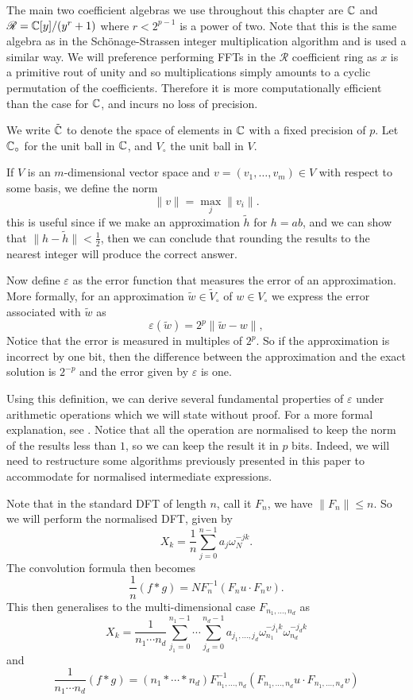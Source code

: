 The main two coefficient algebras we use throughout this chapter are ${\mathbb C}$ and $\mathscr{R} = {\mathbb C}[y]/(y^r + 1)$ where $r < 2^{p-1}$ is a power of two. Note that this is the same algebra as in the Sch\"{o}nage-Strassen integer multiplication algorithm and is used a similar way.
We will preference performing FFTs in the $\mathscr{R}$ coefficient ring as $x$ is a primitive rout of unity and so multiplications simply amounts to a cyclic permutation of the coefficients. Therefore it is more computationally efficient than the case for ${\mathbb C}$, and incurs no loss of precision.

We write $\tilde{{\mathbb C}}$ to denote the space of elements in ${\mathbb C}$ with a fixed precision of $p$. Let ${\mathbb C}_\circ$ for the unit ball in ${\mathbb C}$, and $V_\circ$ the unit ball in $V$.

If $V$ is an $m$-dimensional vector space and $v = (v_1, \ldots, v_m) \in V$ with respect to some basis, we define the norm
\[
    \|v\| = \max_j \|v_i\|.
\]
this is useful since if we make an approximation $\tilde{h}$ for $h = ab$, and we can show that $\|h - \tilde{h}\| < \frac{1}{2}$, then we can conclude that rounding the results to the nearest integer will produce the correct answer.

Now define $\varepsilon$ as the error function that measures the error of an approximation. More formally, for an approximation $\tilde{w} \in \tilde{V}_\circ$ of $w \in V_\circ$ we express the error associated with $\tilde{w}$ as
\[
    \varepsilon(\tilde{w}) = 2^p \|\tilde{w} - w\|,
\]
Notice that the error is measured in multiples of $2^p$. So if the approximation is incorrect by one bit, then the difference between the approximation and the exact solution is $2^{-p}$ and the error given by $\varepsilon$ is one.

Using this definition, we can derive several fundamental properties of $\varepsilon$ under arithmetic operations which we will state without proof. For a more formal explanation, see \cite{nlogn}. Notice that all the operation are normalised to keep the norm of the results less than $1$, so we can keep the result it in $p$ bits. Indeed, we will need to restructure some algorithms previously presented in this paper to accommodate for normalised intermediate expressions.

Note that in the standard DFT of length $n$, call it $F_n$, we have $\|F_n\| \le n$. So we will perform the normalised DFT, given by
\[
    X_k = \frac{1}{n} \sum^{n-1}_{j=0} a_j \omega_N^{-jk}.
\]
The convolution formula then becomes
\[
    \frac{1}{n} (f \ast g) = NF_n^{-1} (F_n u \cdot F_n v).
\]
This then generalises to the multi-dimensional case $F_{n_1, \ldots, n_d}$ as
\[
    X_k = \frac{1}{n_1\cdots n_d} \sum^{n_1-1}_{j_1=0} \cdots \sum^{n_d-1}_{j_d=0} a_{j_1, \ldots, j_d} \omega_{n_1}^{-j_1 k} \omega_{n_d}^{-j_d k}
\]
and
\begin{equation}\label{eq:normalised-convolution}
    \frac{1}{n_1 \cdots n_d} (f \ast g) = (n_1 \ast \cdots \ast n_d)F_{n_1, \ldots, n_d}^{-1} (F_{n_1, \ldots, n_d} u \cdot F_{n_1, \ldots, n_d} v)
\end{equation}

